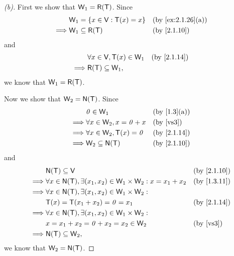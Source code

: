 \begin{proof}[(b)]
	First we show that \(\W_1 = \rg{\T}\).
	Since
	\begin{align*}
		         & \W_1 = \set{x \in \V : \T(x) = x} &  & \by{ex:2.1.26}[a] \\
		\implies & \W_1 \subseteq \rg{\T}            &  & \by{2.1.10}
	\end{align*}
	and
	\begin{align*}
		         & \forall x \in \V, \T(x) \in \W_1 &  & \by{2.1.14} \\
		\implies & \rg{\T} \subseteq \W_1,
	\end{align*}
	we know that \(\W_1 = \rg{\T}\).

	Now we show that \(\W_2 = \ns{\T}\).
	Since
	\begin{align*}
		         & \zv \in \W_1                    &  & \by{1.3}[a]           \\
		\implies & \forall x \in \W_2, x = \zv + x &  & \text{(by \ref{vs3})} \\
		\implies & \forall x \in \W_2, \T(x) = \zv &  & \by{2.1.14}           \\
		\implies & \W_2 \subseteq \ns{\T}          &  & \by{2.1.10}
	\end{align*}
	and
	\begin{align*}
		         & \ns{\T} \subseteq \V                                                           &  & \by{2.1.10}           \\
		\implies & \forall x \in \ns{\T}, \exists (x_1, x_2) \in \W_1 \times \W_2 : x = x_1 + x_2 &  & \by{1.3.11}           \\
		\implies & \forall x \in \ns{\T}, \exists (x_1, x_2) \in \W_1 \times \W_2 :                                          \\
		         & \T(x) = \T(x_1 + x_2) = \zv = x_1                                              &  & \by{2.1.14}           \\
		\implies & \forall x \in \ns{\T}, \exists (x_1, x_2) \in \W_1 \times \W_2 :                                          \\
		         & x = x_1 + x_2 = \zv + x_2 = x_2 \in \W_2                                       &  & \text{(by \ref{vs3})} \\
		\implies & \ns{\T} \subseteq \W_2,
	\end{align*}
	we know that \(\W_2 = \ns{\T}\).
\end{proof}

